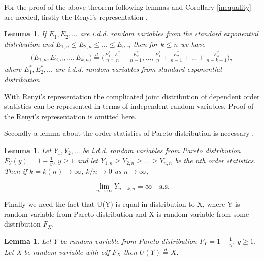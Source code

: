 \documentclass[english,12pt,a4paper,pdftex,sci,utf8]{aaltothesis} %
\newtheorem{lemma}[theorem]{Lemma}
\begin{document}
For the proof of the above theorem following lemmas and Corollary \ref{inequality} are needed, firstly the Renyi's representation \cite{renyi}.
\begin{lemma}
If $E_1, E_2,...$ are i.d.d. random variables from the standard exponential distribution and $E_{1,n} \leq E_{2,n} \leq ... \leq E_{n,n}$ then for $k \leq n$ we have
\begin{multline*}
\big(E_{1,n}, E_{2,n}, ... , E_{k,n}\big) 
\overset{d}{=} \Big(\frac{E_1^*}{n}, \frac{E_1^*}{n}+\frac{E_2^*}{n-1}, ... , \frac{E_1^*}{n}+\frac{E_2^*}{n-1}+...+ \frac{E_k^*}{n-k+1}\Big),
\end{multline*}
where $E_1^*,E_2^*,...$ are i.d.d. random variables from standard exponential distribution.
\label{renrep}
\end{lemma}

With Renyi's representation the complicated joint distribution of dependent order statistics can be represented in terms of independent random variables. Proof of the Renyi's representation is omitted here.

Secondly a lemma about the order statistics of Pareto distribution is necessary \cite{deHaan}.

\begin{lemma}
Let $Y_1, Y_2, ...$ be i.d.d. random variables from Pareto distribution $F_Y(y)=1-\frac{1}{y}$, $y \geq 1$ and let $Y_{1,n} \geq Y_{2,n} \geq ... \geq Y_{n,n}$ be the nth order statistics. Then if $k=k(n)  \rightarrow \infty$, $k/n \rightarrow 0$ as $n \rightarrow \infty$,

\begin{equation*}
\lim_{n\to\infty} Y_{n-k,n} = \infty  \quad  \text{a.s}.
\end{equation*}
\label{asconv}
\end{lemma}


Finally we need the fact that U(Y) is equal in distribution to X, where Y is random variable from Pareto distribution and X is random variable from some distribution $F_X$.

\begin{lemma}
Let $Y$ be random variable from Pareto distribution $F_Y=1-\frac{1}{y}$, $y \geq 1$. Let X be random variable with cdf $F_X$ then $U(Y) \overset{d}{=} X$.
\label{U}
\end{lemma}
\end{document}
